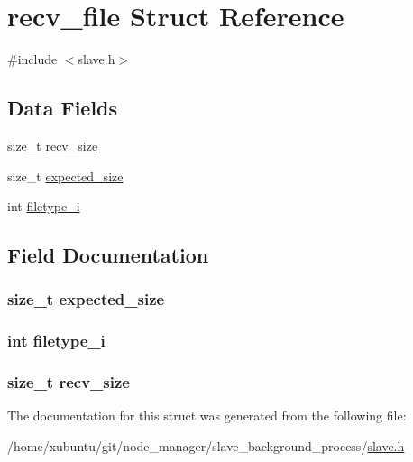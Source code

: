 \hypertarget{structrecv__file}{}\section{recv\+\_\+file Struct Reference}
\label{structrecv__file}


{\ttfamily \#include $<$slave.\+h$>$}

\subsection*{Data Fields}
\begin{DoxyCompactItemize}
\item 
size\+\_\+t \hyperlink{structrecv__file_aa1a92a3c2002b33e06d12f222a71c4ca}{recv\+\_\+size}
\item 
size\+\_\+t \hyperlink{structrecv__file_a4a937f48d6557da1feb644659f2a19c1}{expected\+\_\+size}
\item 
int \hyperlink{structrecv__file_a87720c6483ddde13d7d3c079bd84d7f5}{filetype\+\_\+i}
\end{DoxyCompactItemize}


\subsection{Field Documentation}
\hypertarget{structrecv__file_a4a937f48d6557da1feb644659f2a19c1}{}
\subsubsection[{expected\+\_\+size}]{\setlength{\rightskip}{0pt plus 5cm}size\+\_\+t expected\+\_\+size}\label{structrecv__file_a4a937f48d6557da1feb644659f2a19c1}
\hypertarget{structrecv__file_a87720c6483ddde13d7d3c079bd84d7f5}{}
\subsubsection[{filetype\+\_\+i}]{\setlength{\rightskip}{0pt plus 5cm}int filetype\+\_\+i}\label{structrecv__file_a87720c6483ddde13d7d3c079bd84d7f5}
\hypertarget{structrecv__file_aa1a92a3c2002b33e06d12f222a71c4ca}{}
\subsubsection[{recv\+\_\+size}]{\setlength{\rightskip}{0pt plus 5cm}size\+\_\+t recv\+\_\+size}\label{structrecv__file_aa1a92a3c2002b33e06d12f222a71c4ca}


The documentation for this struct was generated from the following file\+:\begin{DoxyCompactItemize}
\item 
/home/xubuntu/git/node\+\_\+manager/slave\+\_\+background\+\_\+process/\hyperlink{slave_8h}{slave.\+h}\end{DoxyCompactItemize}
